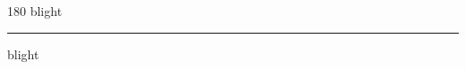 
\begin{frame}
\begin{center}
\begin{turn}{180}
{\fontsize{2.5cm}{1em}\selectfont blight}
\end{turn}
\vspace{1em}\par  
\hrule
\vspace{1em}\par  
{\fontsize{2.5cm}{1em}\selectfont blight}
\end{center}
\end{frame}
